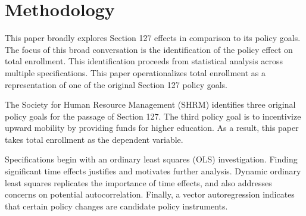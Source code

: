 \documentclass[review]{elsarticle}
\begin{document}
\section{Methodology}

This paper broadly explores Section 127 effects in comparison to its policy goals.
The focus of this broad conversation is the identification of the policy effect on total enrollment.
This identification proceeds from statistical analysis across multiple specifications.
This paper operationalizes total enrollment as a representation of one of the original Section 127 policy goals.

The Society for Human Resource Management (SHRM) \cite{jones_2010} identifies three original policy goals for the passage of Section 127.
The third policy goal is to incentivize upward mobility by providing funds for higher education.
As a result, this paper takes total enrollment as the dependent variable.

Specifications begin with an ordinary least squares (OLS) investigation.
Finding significant time effects justifies and motivates further analysis.
Dynamic ordinary least squares replicates the importance of time effects,
and also addresses concerns on potential autocorrelation.
Finally, a vector autoregression indicates that certain policy changes
are candidate policy instruments.


\end{document}
